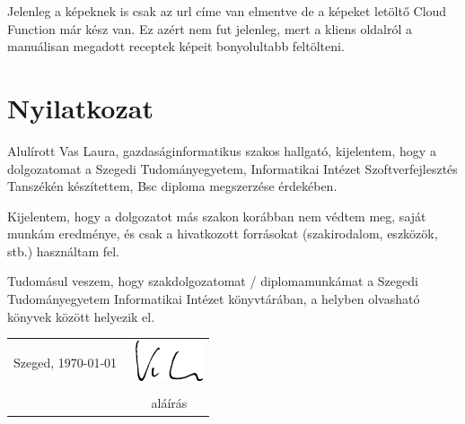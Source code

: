 \documentclass[12pt]{report}
\theoremstyle{definition}
\begin{document}
Jelenleg a képeknek is csak az url címe van elmentve de a képeket letöltő Cloud Function már kész van. Ez azért nem fut jelenleg, mert a kliens oldalról a manuálisan megadott receptek képeit bonyolultabb feltölteni. 


\chapter*{Nyilatkozat}




\noindent
Alulírott %
Vas Laura, gazdaságinformatikus szakos hallgató, kijelentem, hogy a dolgozatomat a Szegedi Tudományegyetem, Informatikai Intézet %
Szoftverfejlesztés Tanszékén készítettem, %
Bsc diploma megszerzése érdekében.

Kijelentem, hogy a dolgozatot más szakon korábban nem védtem meg, saját munkám eredménye, és csak a hivatkozott forrásokat (szakirodalom, eszközök, stb.) használtam fel.

Tudomásul veszem, hogy szakdolgozatomat / diplomamunkámat a Szegedi Tudományegyetem Informatikai Intézet könyvtárában, a helyben olvasható könyvek között helyezik el. 

\vspace*{2cm}

\begin{tabular}{lc}
	Szeged, \today\
	\hspace{2cm} & \includegraphics[height=1.2cm]{pictures/signiture.eps} \\ 
				 & \makebox[6cm]{\dotfill} \\
	             & aláírás                 \\
\end{tabular}
\end{document}

